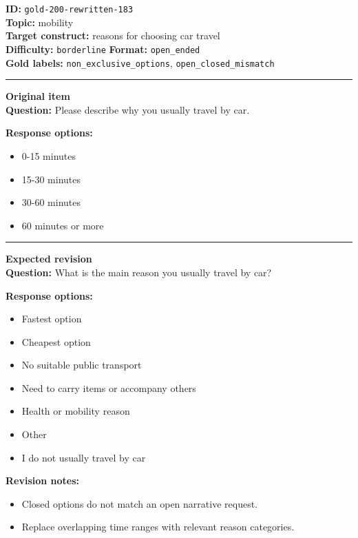 \documentclass[10pt,a4paper]{article}
\newcommand{\sectionline}{\vspace{0.15em}\hrule\vspace{0.35em}}
\begin{document}
\begin{tcolorbox}[colframe=FlawRed,colback=white,colbacktitle=FlawRed!9,coltitle=black,title={Item 183\hfill Flawed item}]
\textbf{ID:} \texttt{gold-200-rewritten-183}\\
\textbf{Topic:} mobility\\
\textbf{Target construct:} reasons for choosing car travel\\
\textbf{Difficulty:} \texttt{borderline} \quad \textbf{Format:} \texttt{open\_ended}\\
\textbf{Gold labels:} \texttt{non\_exclusive\_options}, \texttt{open\_closed\_mismatch}\\
\sectionline
\textbf{Original item}\\
\textbf{Question:} Please describe why you usually travel by car.
\par\textbf{Response options:}
\begin{itemize}
\item 0-15 minutes
\item 15-30 minutes
\item 30-60 minutes
\item 60 minutes or more
\end{itemize}
\sectionline
\textbf{Expected revision}\\
\textbf{Question:} What is the main reason you usually travel by car?
\par\textbf{Response options:}
\begin{itemize}
\item Fastest option
\item Cheapest option
\item No suitable public transport
\item Need to carry items or accompany others
\item Health or mobility reason
\item Other
\item I do not usually travel by car
\end{itemize}
\par\textbf{Revision notes:}
\begin{itemize}
\item Closed options do not match an open narrative request.
\item Replace overlapping time ranges with relevant reason categories.
\end{itemize}
\end{tcolorbox}
\end{document}
